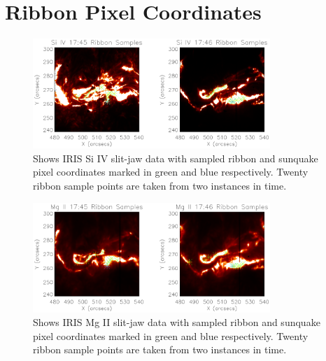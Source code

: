 \appendix
\appendixpage
\addappheadtotoc
%
\section{Ribbon Pixel Coordinates}\label{ribcoords}
\begin{figure}%
  \begin{center}
  \includegraphics[width=0.8\textwidth]{29-Mar-14-SI-Ribbon-Coord-oplot}
  \end{center}
  \caption{Shows IRIS Si IV slit-jaw data with sampled ribbon and sunquake pixel coordinates marked in green and blue respectively. Twenty ribbon sample points are taken from two instances in time.}\label{sirib}
\end{figure}

\begin{figure}%
  \begin{center}
  \includegraphics[width=0.8\textwidth]{29-Mar-14-MG-Ribbon-Coord-oplot}
  \end{center}
  \caption{Shows IRIS Mg II slit-jaw data with sampled ribbon and sunquake pixel coordinates marked in green and blue respectively. Twenty ribbon sample points are taken from two instances in time.}\label{mgrib}
\end{figure}

